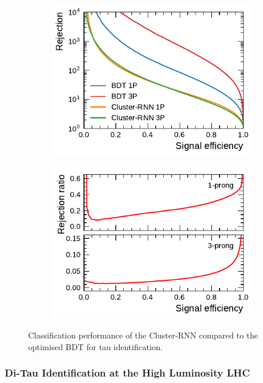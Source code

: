 \begin{figure}[ht]
  \begin{subfigure}[t]{0.48\textwidth}
    \centering
    \includegraphics{./figures/rnn/cluster/roc.pdf}
  \end{subfigure}\hfill
  \begin{subfigure}[t]{0.48\textwidth}
    \centering
    \includegraphics{./figures/rnn/cluster/ratios.pdf}
  \end{subfigure}
  \caption{Classification performance of the Cluster-RNN compared to the optimised
    BDT for tau identification.}
  \label{fig:cluster_rnn_roc_ratios}
\end{figure}

\subsubsection{Di-Tau Identification at the High Luminosity LHC}
\label{sec:hlt_rate_reduction}

